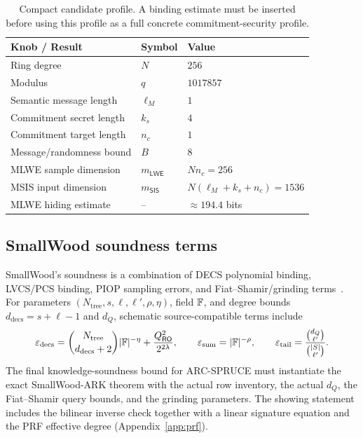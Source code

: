 \begin{table}[H]
\centering
\renewcommand{\arraystretch}{1.15}
\begin{tabular}{@{}lll@{}}
\toprule
\textbf{Knob / Result} & \textbf{Symbol} & \textbf{Value} \\
\midrule
Ring degree & \(N\) & \(256\) \\
Modulus & \(q\) & \(1017857\) \\
Semantic message length & \(\ell_M\) & \(1\) \\
Commitment secret length & \(k_s\) & \(4\) \\
Commitment target length & \(n_c\) & \(1\) \\
Message/randomness bound & \(B\) & \(8\) \\
MLWE sample dimension & \(m_{\mathsf{LWE}}\) & \(Nn_c=256\) \\
MSIS input dimension & \(m_{\mathsf{SIS}}\) & \(N(\ell_M+k_s+n_c)=1536\) \\
MLWE hiding estimate & -- & \(\approx 194.4\) bits \\
\bottomrule
\end{tabular}
\caption{Compact candidate profile.  A binding estimate must be inserted before using this profile as a full concrete
commitment-security profile.}
\label{tab:compact-profile}
\end{table}

\subsection{SmallWood soundness terms}
SmallWood's soundness is a combination of DECS polynomial binding, LVCS/PCS binding, PIOP sampling errors, and
Fiat--Shamir/grinding terms~\cite{EPRINT:FenRiv25b}.  For parameters
\((N_{\mathrm{tree}},s,\ell,\ell',\rho,\eta)\), field \(\mathbb{F}\), and degree bounds
\(d_{\mathrm{decs}}=s+\ell-1\) and \(d_Q\), schematic source-compatible terms include
\[
\varepsilon_{\mathrm{decs}}
=
\binom{N_{\mathrm{tree}}}{d_{\mathrm{decs}}+2}|\mathbb{F}|^{-\eta}
+
\frac{Q_{\mathsf{RO}}^2}{2^{2\lambda}},
\qquad
\varepsilon_{\mathrm{sum}} = |\mathbb{F}|^{-\rho},
\qquad
\varepsilon_{\mathrm{tail}} =
\frac{\binom{d_Q}{\ell'}}{\binom{|S|}{\ell'}}.
\]
The final knowledge-soundness bound for ARC-SPRUCE must instantiate the exact SmallWood-ARK theorem with the
actual row inventory, the actual \(d_Q\), the Fiat--Shamir query bounds, and the grinding parameters.  The showing
statement includes the bilinear inverse check together with a linear signature equation and the PRF effective degree
(Appendix~\ref{app:prf}).

